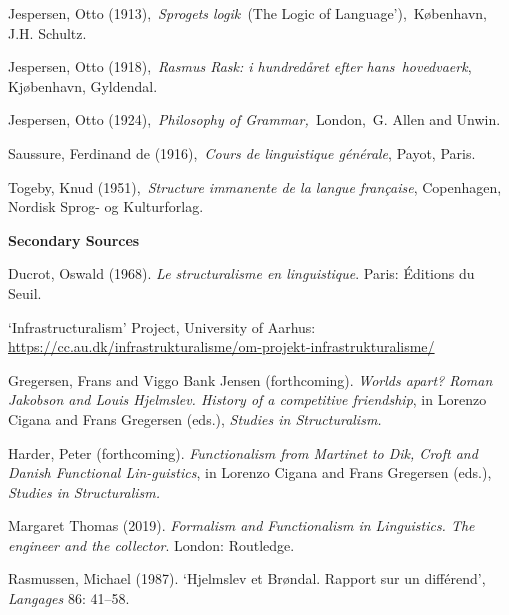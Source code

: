 \begin{styleStandard}
Jespersen, Otto (1913),~\textit{Sprogets logik~}(The Logic of Language’),~København, J.H. Schultz.
\end{styleStandard}

\begin{styleStandard}
Jespersen, Otto (1918),~\textit{Rasmus Rask: i hundredåret efter hans~hovedvaerk}, Kjøbenhavn, Gyldendal.
\end{styleStandard}

\begin{styleStandard}
Jespersen, Otto (1924),~\textit{Philosophy of Grammar,~}London,~G. Allen and Unwin.
\end{styleStandard}

\begin{styleStandard}
Saussure, Ferdinand de (1916),~\textit{Cours de linguistique générale}, Payot, Paris.
\end{styleStandard}

\begin{styleStandard}
Togeby, Knud (1951),~\textit{Structure immanente de la langue française}, Copenhagen, Nordisk Sprog- og Kulturforlag.
\end{styleStandard}

\begin{styleStandard}
\textbf{Secondary Sources}
\end{styleStandard}

\begin{styleStandard}
Ducrot, Oswald (1968). \textit{Le structuralisme en linguistique}. Paris: Éditions du Seuil.
\end{styleStandard}

\begin{styleStandard}
‘Infrastructuralism’ Project, University of Aarhus: \url{https://cc.au.dk/infrastrukturalisme/om-projekt-infrastrukturalisme/}
\end{styleStandard}

\begin{styleStandard}
Gregersen, Frans and Viggo Bank Jensen (forthcoming). \textit{Worlds apart? Roman Jakobson and Louis Hjelmslev. History of a competitive friendship}, in Lorenzo Cigana and Frans Gregersen (eds.),\textit{ Studies in Structuralism.}
\end{styleStandard}

\begin{styleStandard}
Harder, Peter (forthcoming). \textit{Functionalism from Martinet to Dik, Croft and Danish Functional Lin-guistics}, in Lorenzo Cigana and Frans Gregersen (eds.),\textit{ Studies in Structuralism.}
\end{styleStandard}

\begin{styleStandard}
Margaret Thomas (2019). \textit{Formalism and Functionalism in Linguistics. The engineer and the collector}. London: Routledge.
\end{styleStandard}

\begin{styleStandard}
Rasmussen, Michael (1987). ‘Hjelmslev et Brøndal. Rapport sur un différend’, \textit{Langages} 86: 41–58.
\end{styleStandard}

